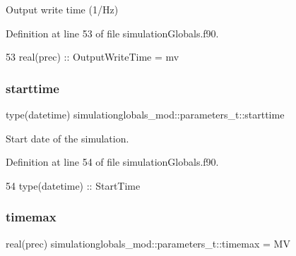 Output write time (1/\+Hz) 



Definition at line 53 of file simulation\+Globals.\+f90.


\begin{DoxyCode}
53         \textcolor{keywordtype}{real(prec)}      :: OutputWriteTime = mv              
\end{DoxyCode}
\mbox{\label{structsimulationglobals__mod_1_1parameters__t_a204cdccb6f9cd2fa137210a7f28f676d}} 
\subsubsection{\texorpdfstring{starttime}{starttime}}
{\footnotesize\ttfamily type(datetime) simulationglobals\+\_\+mod\+::parameters\+\_\+t\+::starttime\hspace{0.3cm}{\ttfamily [private]}}



Start date of the simulation. 



Definition at line 54 of file simulation\+Globals.\+f90.


\begin{DoxyCode}
54         \textcolor{keywordtype}{type}(datetime)  :: StartTime
\end{DoxyCode}
\mbox{\label{structsimulationglobals__mod_1_1parameters__t_a196b29045b2a76de4a1a0efd8c587838}} 
\subsubsection{\texorpdfstring{timemax}{timemax}}
{\footnotesize\ttfamily real(prec) simulationglobals\+\_\+mod\+::parameters\+\_\+t\+::timemax = MV\hspace{0.3cm}{\ttfamily [private]}}



